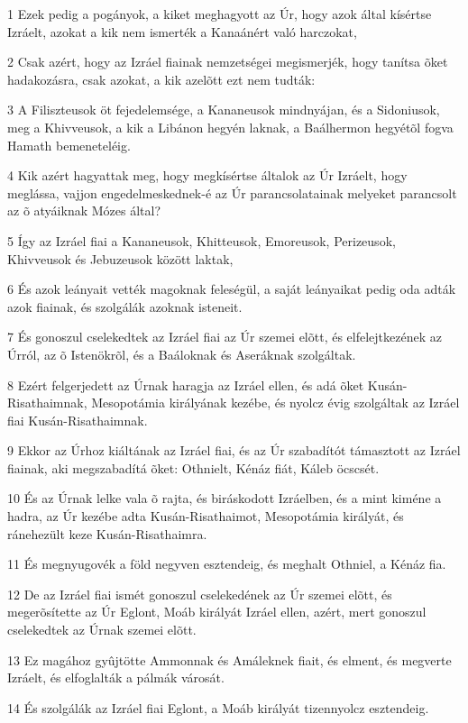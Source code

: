 \par 1 Ezek pedig a pogányok, a kiket meghagyott az Úr, hogy azok által kísértse Izráelt, azokat a kik nem ismerték a Kanaánért való harczokat,
\par 2 Csak azért, hogy az Izráel fiainak nemzetségei megismerjék, hogy tanítsa õket hadakozásra, csak azokat, a kik azelõtt ezt nem tudták:
\par 3 A Filiszteusok öt fejedelemsége, a Kananeusok mindnyájan, és a Sidoniusok, meg a Khivveusok, a kik a Libánon hegyén laknak, a Baálhermon hegyétõl fogva Hamath bemeneteléig.
\par 4 Kik azért hagyattak meg, hogy megkísértse általok az Úr Izráelt, hogy meglássa, vajjon engedelmeskednek-é az Úr parancsolatainak melyeket parancsolt az õ atyáiknak Mózes által?
\par 5 Így az Izráel fiai a Kananeusok, Khitteusok, Emoreusok, Perizeusok, Khivveusok és Jebuzeusok között laktak,
\par 6 És azok leányait vették magoknak feleségül, a saját leányaikat pedig oda adták azok fiainak, és szolgálák azoknak isteneit.
\par 7 És gonoszul cselekedtek az Izráel fiai az Úr szemei elõtt, és elfelejtkezének az Úrról, az õ Istenökrõl, és a Baáloknak és Aseráknak szolgáltak.
\par 8 Ezért felgerjedett az Úrnak haragja az Izráel ellen, és adá õket Kusán-Risathaimnak, Mesopotámia királyának kezébe, és nyolcz évig szolgáltak az Izráel fiai Kusán-Risathaimnak.
\par 9 Ekkor az Úrhoz kiáltának az Izráel fiai, és az Úr szabadítót támasztott az Izráel fiainak, aki megszabadítá õket: Othnielt, Kénáz fiát, Káleb öcscsét.
\par 10 És az Úrnak lelke vala õ rajta, és biráskodott Izráelben, és a mint kiméne a hadra, az Úr kezébe adta Kusán-Risathaimot, Mesopotámia királyát, és ránehezült keze Kusán-Risathaimra.
\par 11 És megnyugovék a föld negyven esztendeig, és meghalt Othniel, a Kénáz fia.
\par 12 De az Izráel fiai ismét gonoszul cselekedének az Úr szemei elõtt, és megerõsítette az Úr Eglont, Moáb királyát Izráel ellen, azért, mert gonoszul cselekedtek az Úrnak szemei elõtt.
\par 13 Ez magához gyûjtötte Ammonnak és Amáleknek fiait, és elment, és megverte Izráelt, és elfoglalták a pálmák városát.
\par 14 És szolgálák az Izráel fiai Eglont, a Moáb királyát tizennyolcz esztendeig.
